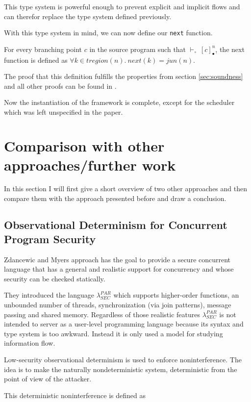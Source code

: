 \documentclass[a4paper,10pt]{llncs}
\begin{document}
This type system is powerful enough to prevent explicit and implicit flows and can therefor
replace the type system defined previously.

With this type system in mind, we can now define our \texttt{next} function.

\begin{definition}
For every branching point $c$ in the source program such that $\vdash_\circ~[c]_\bullet^n$, the next function
is defined as $\forall k \in tregion(n) .\ next(k) = jun(n)$.
\end{definition}

The proof that this definition fulfills the properties from section \ref{sec:soundness} and all other
proofs can be found in \cite{Barthe09}.

Now the instantiation of the framework is complete, except for the scheduler which was left unspecified
in the paper.

\newpage
\section{Comparison with other approaches/further work}
\label{sec:furtherwork}
In this section I will first give a short overview of two other approaches and then
compare them with the approach presented before and draw a conclusion.

\subsection{Observational Determinism for Concurrent Program Security\cite{Zdancewic03}}
Zdancewic and Myers approach has the goal to provide a secure concurrent language
that has a general and realistic support for concurrency and whose security can
be checked statically.

They introduced the language $\lambda_{SEC}^{PAR}$ which supports higher-order functions, an
unbounded number of threads, synchronization (via join patterns), message passing and shared memory. Regardless of those realistic
features $\lambda_{SEC}^{PAR}$ is not intended to server as a user-level programming language because its
syntax and type system is too awkward. Instead it is only used a model for studying information flow.

Low-security observational determinism is used to enforce noninterference. The idea is
to make the naturally nondeterministic system, deterministic from the point of view
of the attacker.

This deterministic noninterference is defined as
\end{document}
